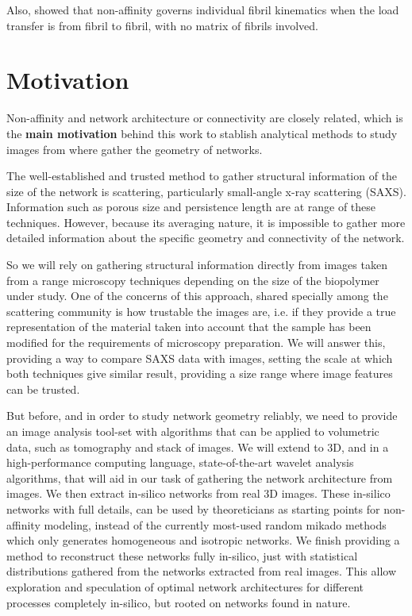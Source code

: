  Also, \citet{chandran_affine_2006}
showed that non-affinity governs individual fibril kinematics when the load
transfer is from fibril to fibril, with no matrix of fibrils involved.


\section{Motivation}%
\label{sec:motivation-intro}
Non-affinity and network architecture or connectivity are closely related, which
is the \textbf{main motivation} behind this work to stablish analytical methods to study images
from where gather the geometry of networks.

The well-established and trusted method to gather structural information of the size of the network
is scattering, particularly small-angle x-ray scattering (SAXS). Information such as porous
size and persistence length are at range of these techniques. However, because its
averaging nature, it is impossible to gather more detailed information about the specific geometry
and connectivity of the network.

So we will rely on gathering structural information directly from images taken from a range microscopy techniques depending on the size of the biopolymer under study.
One of the concerns of this approach, shared specially among the scattering community is how trustable the images are, i.e. if they provide a true representation of the material taken into account that the sample has been modified for the requirements of microscopy preparation. We will answer this, providing a way to compare SAXS data with images, setting the scale at which both techniques give similar result, providing a size range where image features can be trusted.

But before, and in order to study network geometry reliably, we need to provide an image analysis tool-set with algorithms that can be applied to volumetric data, such as tomography and stack of images.
We will extend to 3D, and in a high-performance computing language, state-of-the-art wavelet analysis algorithms, that will aid in our task of gathering the network architecture from images.
We then extract in-silico networks from real 3D images.
These in-silico networks with full details, can be used by theoreticians as starting points for non-affinity modeling, instead of the currently most-used random mikado methods which only generates homogeneous and isotropic networks.
We finish providing a method to reconstruct these networks fully in-silico, just with statistical
distributions gathered from the networks extracted from real images. This allow exploration and speculation of optimal network architectures for different processes completely in-silico, but rooted on networks found in nature.

